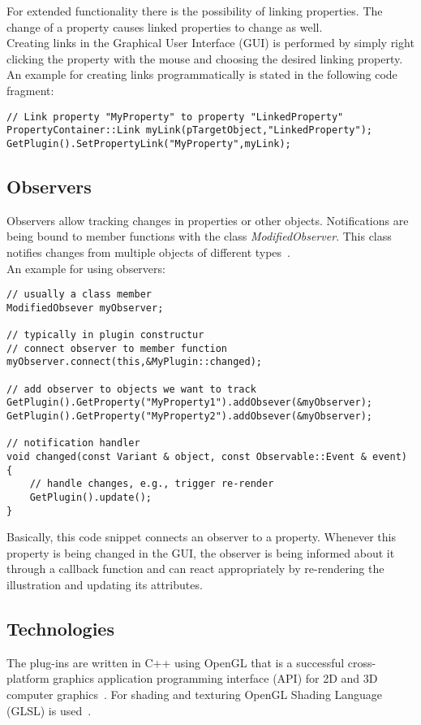 For extended functionality there is the possibility of linking properties. The change of a property causes linked properties to change as well.\\
Creating links in the Graphical User Interface (GUI) is performed by simply right clicking the property with the mouse and choosing the desired linking property.\\
An example for creating links programmatically is stated in the following code fragment:
\begin{lstlisting}
// Link property "MyProperty" to property "LinkedProperty"
PropertyContainer::Link myLink(pTargetObject,"LinkedProperty");
GetPlugin().SetPropertyLink("MyProperty",myLink);
\end{lstlisting}

\subsection{Observers}
\label{chap:observers}
Observers allow tracking changes in properties or other objects. Notifications are being bound to member functions with the class \emph{ModifiedObserver}. This class notifies changes from multiple objects of different types~\cite{misc:volumeshop101}.\\
An example for using observers:
\begin{lstlisting}
// usually a class member
ModifiedObsever myObserver;

// typically in plugin constructur
// connect observer to member function
myObserver.connect(this,&MyPlugin::changed);

// add observer to objects we want to track
GetPlugin().GetProperty("MyProperty1").addObsever(&myObserver);
GetPlugin().GetProperty("MyProperty2").addObsever(&myObserver);

// notification handler
void changed(const Variant & object, const Observable::Event & event)
{
	// handle changes, e.g., trigger re-render
	GetPlugin().update();
}
\end{lstlisting}
Basically, this code snippet connects an observer to a property. Whenever this property is being changed in the GUI, the observer is being informed about it through a callback function and can react appropriately by re-rendering the illustration and updating its attributes.\\

\subsection{Technologies}
The plug-ins are written in C++ using OpenGL that is a successful cross-platform graphics application programming interface (API) for 2D and 3D computer graphics~\cite{book:computerGraphicsHill}.%
For shading and texturing OpenGL Shading Language (GLSL) is used~\cite{misc:volumeshop101}.

